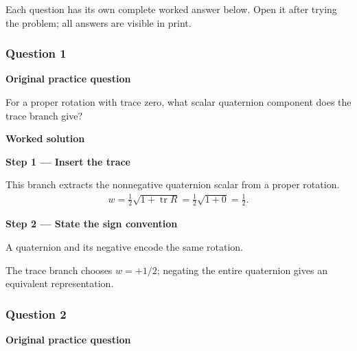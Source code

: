 \documentclass[letterpaper,11pt,english,openany,oneside]{jupyterBook}
\begin{document}
\sphinxAtStartPar
Each question has its own complete worked answer below. Open it after trying the problem; all answers are visible in print.


\subsubsection{Question 1}
\label{\detokenize{lectures/lecture02/tldr:question-1}}\label{\detokenize{lectures/lecture02/tldr:lec02-tldr-q1}}
\par\medskip\textbf{Original practice question}\par\smallskip

\sphinxAtStartPar
For a proper rotation with trace zero, what scalar quaternion component does the trace branch give?

\par\medskip

\par\medskip
\textbf{Worked solution}\par\smallskip

\par\medskip{}
{\color{QuizStepRed}\bfseries Step 1 — Insert the trace}\par\smallskip

\sphinxAtStartPar
{} This branch extracts the nonnegative quaternion scalar from a proper rotation.
{\color{QuizMathBlue} \begin{equation*}
\begin{split}
w=\frac12\sqrt{1+\operatorname{tr}R}=\frac12\sqrt{1+0}=\frac12.
\end{split}
\end{equation*}}
\par

\par\medskip{}
{\color{QuizStepRed}\bfseries Step 2 — State the sign convention}\par\smallskip

\sphinxAtStartPar
{} A quaternion and its negative encode the same rotation.

\sphinxAtStartPar
The trace branch chooses {\color{QuizMathBlue} \(w=+1/2\)}; negating the entire quaternion gives an equivalent representation.

\par

\par\medskip


\subsubsection{Question 2}
\label{\detokenize{lectures/lecture02/tldr:question-2}}\label{\detokenize{lectures/lecture02/tldr:lec02-tldr-q2}}
\par\medskip\textbf{Original practice question}\par\smallskip
\end{document}
